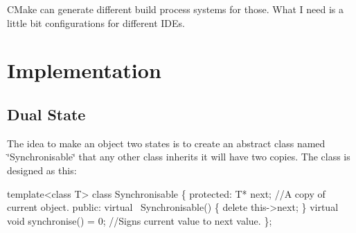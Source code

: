 C\+Make can generate different build process systems for those. What I need is a little bit configurations for different I\+D\+Es. 
\hypertarget{_conformanceto_specificationand_design_manual_Implementation}{}\section{Implementation}\label{_conformanceto_specificationand_design_manual_Implementation}
\hypertarget{_conformanceto_specificationand_design_manual_ImplementationDualState}{}\subsection{Dual State}\label{_conformanceto_specificationand_design_manual_ImplementationDualState}
The idea to make an object two states is to create an abstract class named \char`\"{}\+Synchronisable\char`\"{} that any other class inherits it will have two copies. The class is designed as this\+: 
\begin{DoxyCode}
\textcolor{keyword}{template}<\textcolor{keyword}{class} T> \textcolor{keyword}{class }Synchronisable
\{
\textcolor{keyword}{protected}:
    T* next; \textcolor{comment}{//A copy of current object.}
\textcolor{keyword}{public}:
    \textcolor{keyword}{virtual} ~Synchronisable() \{
        \textcolor{keyword}{delete} this->next;
    \}
    \textcolor{keyword}{virtual} \textcolor{keywordtype}{void} synchronise() = 0; \textcolor{comment}{//Signs current value to next value.}
\};
\end{DoxyCode}

